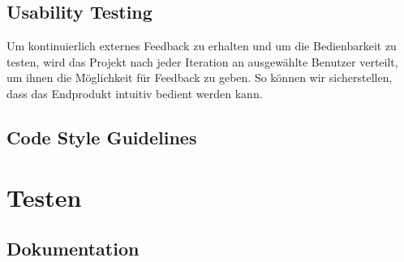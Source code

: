\subsection{Usability Testing}
Um kontinuierlich externes Feedback zu erhalten und um die Bedienbarkeit zu testen, wird das Projekt nach jeder Iteration an ausgewählte Benutzer verteilt, um ihnen die Möglichkeit für Feedback zu geben. So können wir sicherstellen, dass das Endprodukt intuitiv bedient werden kann.

\subsection{Code Style Guidelines}

\section{Testen}

\subsection{Dokumentation}

